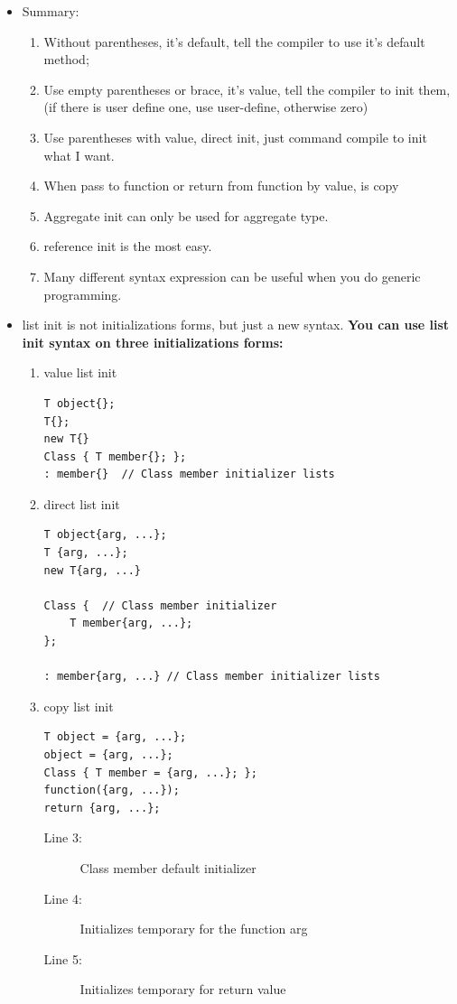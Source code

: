 \documentclass[a4paper,11pt,twoside]{book}
\begin{document}
\begin{itemize}
	\item Summary:
\begin{enumerate}
	\item Without parentheses, it's default, tell the compiler to use it's default method;
	\item Use empty parentheses or brace, it's value, tell the compiler to init them, (if there is user define one, use user-define, otherwise zero)
	\item Use parentheses with value, direct init, just command compile to init what I want.
	\item When pass to function or return from function by value, is copy
	\item Aggregate init can only be used for aggregate type.
	\item reference init is the most easy.
	\item Many different syntax expression can be useful when you do generic programming.
\end{enumerate}

\item list init is not initializations forms, but just a new syntax. \textbf{You can use list init syntax on three initializations forms:}
\begin{enumerate}
	\item value list init
\begin{lstlisting}[numbers=none]
T object{};
T{};
new T{}
Class { T member{}; };
: member{}  // Class member initializer lists
\end{lstlisting}
	\item direct list init
\begin{lstlisting}[numbers=none]
T object{arg, ...};
T {arg, ...};
new T{arg, ...}

Class {  // Class member initializer
	T member{arg, ...}; 
};
 
: member{arg, ...} // Class member initializer lists
\end{lstlisting}
	\item copy list init
\begin{lstlisting}
T object = {arg, ...};
object = {arg, ...};
Class { T member = {arg, ...}; };
function({arg, ...}); 
return {arg, ...};  
\end{lstlisting}
\begin{description}
	\item[Line 3:] Class member default initializer
	\item[Line 4:] Initializes temporary for the function arg
	\item[Line 5:] Initializes temporary for return value
\end{description}
\end{enumerate}


\end{itemize}
\end{document}
